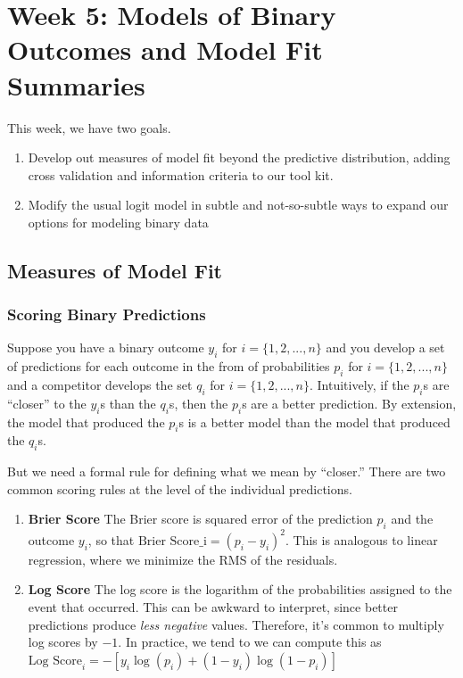 \documentclass[
]{book}
\providecommand{\tightlist}{%
  \setlength{\itemsep}{0pt}\setlength{\parskip}{0pt}}
\begin{document}
\hypertarget{week-5-models-of-binary-outcomes-and-model-fit-summaries}{%
\chapter{Week 5: Models of Binary Outcomes and Model Fit Summaries}\label{week-5-models-of-binary-outcomes-and-model-fit-summaries}}

This week, we have two goals.

\begin{enumerate}
\def\labelenumi{\arabic{enumi}.}
\tightlist
\item
  Develop out measures of model fit beyond the predictive distribution, adding cross validation and information criteria to our tool kit.
\item
  Modify the usual logit model in subtle and not-so-subtle ways to expand our options for modeling binary data
\end{enumerate}

\hypertarget{measures-of-model-fit}{%
\section{Measures of Model Fit}\label{measures-of-model-fit}}

\hypertarget{scoring-binary-predictions}{%
\subsection{Scoring Binary Predictions}\label{scoring-binary-predictions}}

Suppose you have a binary outcome \(y_i\) for \(i = \{1, 2, ..., n\}\) and you develop a set of predictions for each outcome in the from of probabilities \(p_i\) for \(i = \{1, 2, ..., n\}\) and a competitor develops the set \(q_i\) for \(i = \{1, 2, ..., n\}\). Intuitively, if the \(p_i\)s are ``closer'' to the \(y_i\)s than the \(q_i\)s, then the \(p_i\)s are a better prediction. By extension, the model that produced the \(p_i\)s is a better model than the model that produced the \(q_i\)s.

But we need a formal rule for defining what we mean by ``closer.'' There are two common scoring rules at the level of the individual predictions.

\begin{enumerate}
\def\labelenumi{\arabic{enumi}.}
\tightlist
\item
  \textbf{Brier Score} The Brier score is squared error of the prediction \(p_i\) and the outcome \(y_i\), so that \(\text{Brier Score_i} = (p_i -y_i)^2\). This is analogous to linear regression, where we minimize the RMS of the residuals.
\item
  \textbf{Log Score} The log score is the logarithm of the probabilities assigned to the event that occurred. This can be awkward to interpret, since better predictions produce \emph{less negative} values. Therefore, it's common to multiply log scores by \(-1\). In practice, we tend to we can compute this as \(\text{Log Score}_i = - [y_i \log(p_i) + (1 - y_i) \log (1 - p_i)]\)
\end{enumerate}
\end{document}
